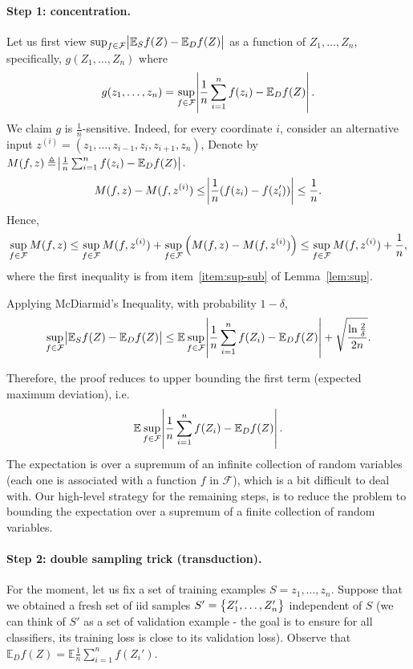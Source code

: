 \documentclass{article}
\newcommand{\EE}{\mathbb{E}}
\newcommand{\Fcal}{\mathcal{F}}
\newcommand{\defeq}{\triangleq}
\begin{document}
\paragraph{Step 1: concentration.} Let us first view $\sup_{f \in \Fcal} \abs{\EE_S f(Z) - \EE_D f(Z)}$ as a function of $Z_1,\ldots,Z_n$, specifically, $g(Z_1,\ldots,Z_n)$ where
\[ g(z_1,\ldots,z_n) = \sup_{f \in \Fcal} \abs{ \frac{1}{n} \sum_{i=1}^n f(z_i)- \EE_D f(Z) }. \]
We claim $g$ is $\frac1n$-sensitive.
Indeed, for every coordinate $i$, consider an alternative input $z^{(i)} = (z_1,\ldots,z_{i-1},z_i,z_{i+1}, z_n)$,
Denote by $M(f, z) \defeq \abs{\frac{1}{n} \sum_{i=1}^n f(z_i)- \EE_D f(Z)}$.
\[ M(f, z) - M(f, z^{(i)}) \leq \abs{\frac{1}{n}(f(z_i) - f(z_i'))} \leq \frac{1}{n}. \]
Hence,
\[ \sup_{f \in \Fcal} M(f, z)
   \leq \sup_{f \in \Fcal} M(f, z^{(i)}) + \sup_{f \in \Fcal} \del{M(f,z) - M(f,z^{(i)})}
   \leq \sup_{f \in \Fcal} M(f, z^{(i)}) + \frac1n, \]
where the first inequality is from item~\ref{item:sup-sub} of Lemma~\ref{lem:sup}.

Applying McDiarmid's Inequality, with probability $1-\delta$,
\[\sup_{f \in \Fcal} \abs{\EE_S f(Z) - \EE_D f(Z)} \leq \EE \sup_{f \in \Fcal} \abs{\frac{1}{n} \sum_{i=1}^n f(Z_i) - \EE_D f(Z)} + \sqrt{\frac{\ln\frac{2}{\delta}}{2n}}. \]

Therefore, the proof reduces to upper bounding the first term (expected maximum deviation), i.e.
\begin{equation}
  \EE \sup_{f \in \Fcal} \abs{\frac{1}{n} \sum_{i=1}^n f(Z_i) - \EE_D f(Z)}.
  \label{eqn:exp-max-dev}
\end{equation}
The expectation is over a supremum of
an infinite collection of random variables (each one is associated with a function $f$ in
$\Fcal$), which is a bit difficult to deal with. Our high-level strategy for the remaining steps, is to reduce the problem to bounding the expectation over a supremum of a finite collection of random variables.

\paragraph{Step 2: double sampling trick (transduction).} For the moment, let us fix a set of training examples $S = {z_1, \ldots, z_n}$. Suppose that we obtained a fresh set of iid samples $S' = \cbr{Z_1', \ldots, Z_n'}$ independent of $S$ (we can think of $S'$ as a set of validation example - the goal is to ensure for all classifiers, its training loss is close to its validation loss). Observe that $\EE_D f(Z) = \EE \frac{1}{n} \sum_{i=1}^n f(Z_i')$. %
\end{document}
